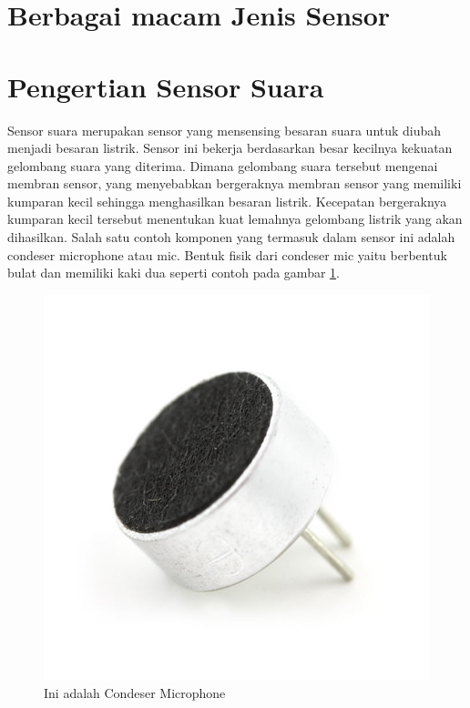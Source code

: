 \section{Berbagai macam Jenis Sensor}
\section{Pengertian Sensor Suara}
Sensor suara merupakan sensor yang mensensing besaran suara untuk diubah menjadi besaran listrik. Sensor ini bekerja berdasarkan besar kecilnya kekuatan gelombang suara yang diterima. Dimana gelombang suara tersebut mengenai membran sensor, yang menyebabkan bergeraknya membran sensor yang memiliki kumparan kecil sehingga menghasilkan besaran listrik. Kecepatan bergeraknya kumparan kecil tersebut menentukan kuat lemahnya gelombang listrik yang akan dihasilkan. Salah satu contoh komponen yang termasuk dalam sensor ini adalah condeser microphone atau mic. Bentuk fisik dari condeser mic yaitu berbentuk bulat dan memiliki kaki dua seperti contoh pada gambar \ref{fig:sscondesermic}.
\begin{figure}[!htbp]
  \centering
  \includegraphics[width=.75\textwidth]{figures/Arduino/sscondesermic.jpg}
  \caption{Ini adalah Condeser Microphone}\label{fig:sscondesermic}
\end{figure}

